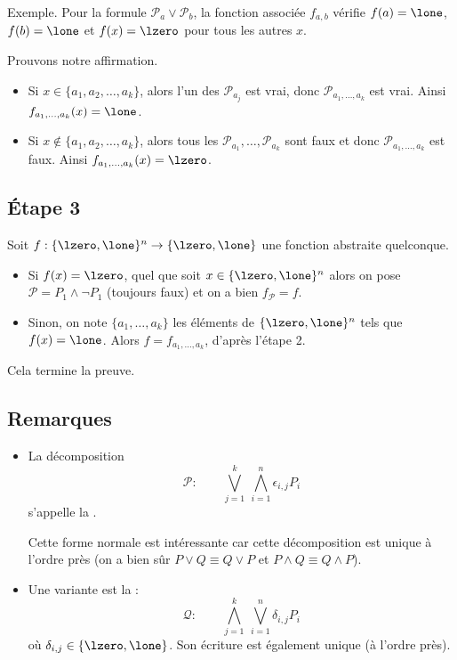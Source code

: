 \documentclass[11pt,class=report,crop=false]{standalone}
\begin{document}
Exemple.
Pour la formule $\mathcal{P}_a \lor \mathcal{P}_b$, la fonction associée $f_{a,b}$ vérifie $f(a)=\lone$, $f(b)=\lone$ et $f(x) = \lzero$ pour tous les autres $x$.

Prouvons notre affirmation.
\begin{itemize}
	\item Si $x \in \{ a_1,a_2,\ldots,a_k \}$, alors l'un des $\mathcal{P}_{a_j}$ est vrai, donc $\mathcal{P}_{a_1,\ldots,a_k}$ est vrai. Ainsi $f_{a_1,\ldots,a_k}(x) = \lone$.
	
	\item Si $x \notin \{ a_1,a_2,\ldots,a_k \}$, alors tous les $\mathcal{P}_{a_1},\ldots,\mathcal{P}_{a_k}$ sont faux et donc $\mathcal{P}_{a_1,\ldots,a_k}$ est faux. Ainsi $f_{a_1,\ldots,a_k}(x) = \lzero$.
\end{itemize}


\subsection{Étape 3}

Soit $f : \{\lzero,\lone\}^n \to \{\lzero,\lone\}$ une fonction abstraite quelconque.
\begin{itemize}
	\item Si $f(x) = \lzero$, quel que soit $x \in  \{\lzero,\lone\}^n$ alors on pose
	$\mathcal{P} = P_1 \land \lnot P_1$ (toujours faux) et on a bien $f_{\mathcal{P}} = f$.
	
	\item Sinon, on note $\{a_1,\ldots,a_k\}$ les éléments de  $\{\lzero,\lone\}^n$
	tels que $f(x) = \lone$. Alors $f = f_{a_1,\ldots,a_k}$, d'après l'étape 2.
\end{itemize}

Cela termine la preuve.


\subsection{Remarques}


\begin{itemize}
	\item La décomposition 
	\[
	\mathcal{P} : \qquad \bigvee_{j=1}^k \ \bigwedge_{i=1}^n \epsilon_{i,j} P_i
	\]
	s'appelle la .
	
	Cette forme normale est intéressante car cette décomposition est unique à l'ordre près (on a bien sûr $P \lor Q  \equiv Q \lor P$ et $P\land Q \equiv Q \land P$).
	
	\item Une variante est la  : 
	\[
	\mathcal{Q} : \qquad \bigwedge_{j=1}^k \ \bigvee_{i=1}^n \delta_{i,j} P_i
	\]	
	où $\delta_{i,j} \in \{\lzero,\lone\}$.
	Son écriture est également unique (à l'ordre près). 
	
\end{itemize}
\end{document}
